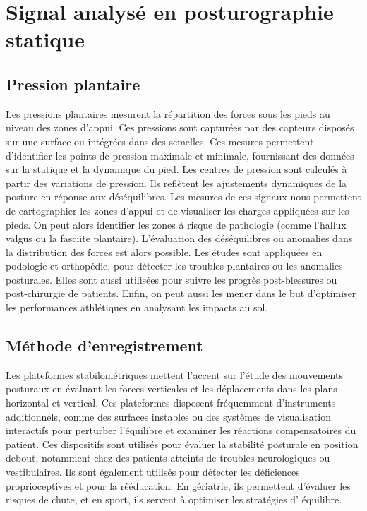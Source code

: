 \section{Signal analysé en posturographie statique}

\subsection{Pression plantaire}

Les pressions plantaires mesurent la répartition des forces sous les pieds au niveau des zones d’appui.
Ces pressions sont capturées par des capteurs disposés sur une surface ou intégrées dans des semelles.
Ces mesures permettent d’identifier les points de pression maximale et minimale, fournissant des données sur la statique et la dynamique du pied.
Les centres de pression sont calculés à partir des variations de pression.
Ils reflètent les ajustements dynamiques de la posture en réponse aux déséquilibres.
Les mesures de ces signaux nous permettent de cartographier les zones d'appui et de visualiser les charges appliquées sur les pieds.
On peut alors identifier les zones à risque de pathologie (comme l’hallux valgus ou la fasciite plantaire).
L'évaluation des déséquilibres ou anomalies dans la distribution des forces est alors possible.
Les études sont appliquées en podologie et orthopédie, pour détecter les troubles plantaires ou les anomalies posturales.
Elles sont aussi utilisées pour suivre les progrès post-blessures ou post-chirurgie de patients.
Enfin, on peut aussi les mener dans le but d’optimiser les performances athlétiques en analysant les impacts au sol.

\subsection{Méthode d'enregistrement}

Les plateformes stabilométriques mettent l’accent sur l'étude des mouvements posturaux en évaluant les forces verticales et les déplacements dans les plans horizontal et vertical.
Ces plateformes disposent fréquemment d’instruments additionnels, comme des surfaces instables ou des systèmes de visualisation interactifs pour perturber l'équilibre et examiner les réactions compensatoires du patient.
Ces dispositifs sont utilisés pour évaluer la stabilité posturale en position debout, notamment chez des patients atteints de troubles neurologiques ou vestibulaires.
Ils sont également utilisés pour détecter les déficiences proprioceptives et pour la rééducation.
En gériatrie, ils permettent d'évaluer les risques de chute, et en sport, ils servent à optimiser les stratégies d' équilibre.\\


